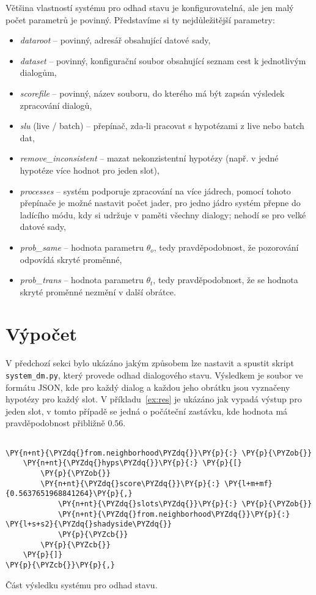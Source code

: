 Většina vlastností systému pro odhad stavu je konfigurovatelná, ale jen malý počet parametrů je povinný.
Představíme si ty nejdůležitější parametry:
\begin{itemize}
\item \emph{dataroot} -- povinný, adresář obsahující datové sady,
\item \emph{dataset} -- povinný, konfigurační soubor obsahující seznam cest k jednotlivým dialogům,
\item \emph{scorefile} -- povinný, název souboru, do kterého má být zapsán výsledek zpracování dialogů,
\item \emph{slu} (live / batch) -- přepínač, zda-li pracovat s hypotézami z live nebo batch dat,
\item \emph{remove\_inconsistent} -- mazat nekonzistentní hypotézy (např. v jedné hypotéze více hodnot pro jeden slot),
\item \emph{processes} -- systém podporuje zpracování na více jádrech, pomocí tohoto přepínače je možné nastavit počet jader, pro jedno jádro systém přepne do ladícího módu, kdy si udržuje v paměti všechny dialogy; nehodí se pro velké datové sady,
\item \emph{prob\_same} -- hodnota parametru $\theta_o$, tedy pravděpodobnost, že pozorování odpovídá skryté proměnné,
\item \emph{prob\_trans} -- hodnota parametru $\theta_t$, tedy pravděpodobnost, že se hodnota skryté proměnné nezmění v další obrátce.
\end{itemize}

\section{Výpočet}

V předchozí sekci bylo ukázáno jakým způsobem lze nastavit a spustit skript \texttt{system\_dm.py}, který provede odhad dialogového stavu.
Výsledkem je soubor ve formátu JSON, kde pro každý dialog a každou jeho obrátku jsou vyznačeny hypotézy pro každý slot.
V příkladu~\ref{ex:res} je ukázáno jak vypadá výstup pro jeden slot, v tomto případě se jedná o počáteční zastávku, kde hodnota  má pravděpodobnost přibližně $0.56$.

\begin{example}
\begin{Verbatim}[commandchars=\\\{\}]

\PY{n+nt}{\PYZdq{}from.neighborhood\PYZdq{}}\PY{p}{:} \PY{p}{\PYZob{}}
    \PY{n+nt}{\PYZdq{}hyps\PYZdq{}}\PY{p}{:} \PY{p}{[}
        \PY{p}{\PYZob{}}
	    \PY{n+nt}{\PYZdq{}score\PYZdq{}}\PY{p}{:} \PY{l+m+mf}{0.5637651968841264}\PY{p}{,}
            \PY{n+nt}{\PYZdq{}slots\PYZdq{}}\PY{p}{:} \PY{p}{\PYZob{}}
	        \PY{n+nt}{\PYZdq{}from.neighborhood\PYZdq{}}\PY{p}{:} \PY{l+s+s2}{\PYZdq{}shadyside\PYZdq{}}
            \PY{p}{\PYZcb{}}
        \PY{p}{\PYZcb{}}
    \PY{p}{]}
\PY{p}{\PYZcb{}}\PY{p}{,}
\end{Verbatim}
\caption{Část výsledku systému pro odhad stavu.}
\label{ex:res}
\end{example}

